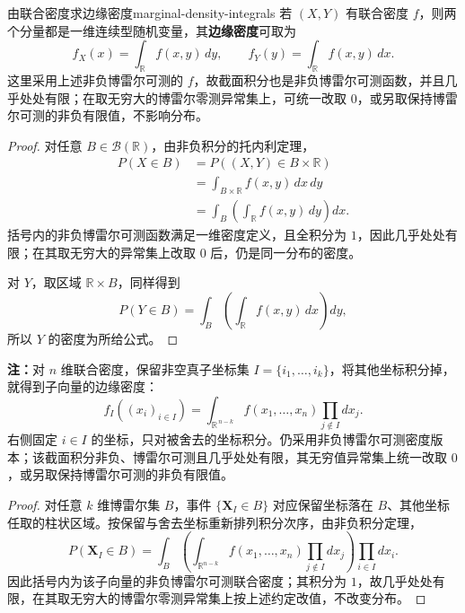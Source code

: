 \begin{mytheorem}{由联合密度求边缘密度}{marginal-density-integrals}
若 $(X,Y)$ 有联合密度 $f$，则两个分量都是一维连续型随机变量，其\textbf{边缘密度}可取为
\[
f_X(x)=\int_{\mathbb R}f(x,y)\,dy,\qquad
f_Y(y)=\int_{\mathbb R}f(x,y)\,dx.
\]
这里采用上述非负博雷尔可测的 $f$，故截面积分也是非负博雷尔可测函数，并且几乎处处有限；在取无穷大的博雷尔零测异常集上，可统一改取 $0$，或另取保持博雷尔可测的非负有限值，不影响分布。
\end{mytheorem}
\begin{proof}
对任意 $B\in\mathcal B(\mathbb R)$，由非负积分的托内利定理，
\begin{align*}
P(X\in B)
&=P((X,Y)\in B\times\mathbb R)\\
&=\int_{B\times\mathbb R}f(x,y)\,dx\,dy\\
&=\int_B\left(\int_{\mathbb R}f(x,y)\,dy\right)dx.
\end{align*}
括号内的非负博雷尔可测函数满足一维密度定义，且全积分为 $1$，因此几乎处处有限；在其取无穷大的异常集上改取 $0$ 后，仍是同一分布的密度。

对 $Y$，取区域 $\mathbb R\times B$，同样得到
\[
P(Y\in B)=\int_B\left(\int_{\mathbb R}f(x,y)\,dx\right)dy,
\]
所以 $Y$ 的密度为所给公式。
\end{proof}

\textbf{注：}\quad 对 $n$ 维联合密度，保留非空真子坐标集 $I=\{i_1,\ldots,i_k\}$，将其他坐标积分掉，就得到子向量的边缘密度：
\[
f_I((x_i)_{i\in I})
=\int_{\mathbb R^{\,n-k}}f(x_1,\ldots,x_n)\prod_{j\notin I}dx_j.
\]
右侧固定 $i\in I$ 的坐标，只对被舍去的坐标积分。仍采用非负博雷尔可测密度版本；该截面积分非负、博雷尔可测且几乎处处有限，其无穷值异常集上统一改取 $0$，或另取保持博雷尔可测的非负有限值。

\begin{proof}
对任意 $k$ 维博雷尔集 $B$，事件 $\{\boldsymbol X_I\in B\}$ 对应保留坐标落在 $B$、其他坐标任取的柱状区域。按保留与舍去坐标重新排列积分次序，由非负积分定理，
\[
P(\boldsymbol X_I\in B)=
\int_B\left(\int_{\mathbb R^{n-k}}f(x_1,\ldots,x_n)\prod_{j\notin I}dx_j\right)
\prod_{i\in I}dx_i.
\]
因此括号内为该子向量的非负博雷尔可测联合密度；其积分为 $1$，故几乎处处有限，在其取无穷大的博雷尔零测异常集上按上述约定改值，不改变分布。
\end{proof}

